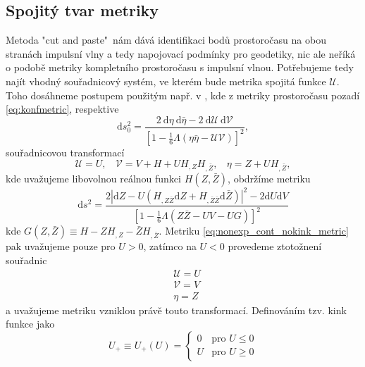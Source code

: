 \subsection{Spojitý tvar metriky}
Metoda "cut and paste"\ nám dává identifikaci bodů prostoročasu na obou stranách impulsní vlny a tedy napojovací podmínky
pro geodetiky, nic ale neříká o podobě metriky kompletního prostoročasu s impulsní vlnou. Potřebujeme tedy najít vhodný
souřadnicový systém, ve kterém bude metrika spojitá funkce $\mathcal{U}$. Toho dosáhneme postupem použitým např. v
\cite{Podolsky:2014ysa}, kde z metriky prostoročasu pozadí \eqref{eq:konfmetric}, respektive
\begin{equation}
    \label{eq:null_background_metric}
    \mathrm{d}s_0^2 = \frac{2~\mathrm{d}\eta~\mathrm{d}\bar{\eta}-2~\mathrm{d}\mathcal{U}~\mathrm{d}\mathcal{V}}
    {\left[1-\frac{1}{6}\Lambda \left(\eta \bar{\eta}
    -\mathcal{U}\mathcal{V}\right)\right]^2},
\end{equation}
souřadnicovou transformací
\begin{equation}
    \label{eq:nonexp_cont_transform}
    \mathcal{U}=U,~~~~ \mathcal{V}=V+H+UH_{,Z}H_{,\bar{Z}},~~~~ \eta=Z+UH_{,\bar{Z}},
\end{equation}
kde uvažujeme libovolnou reálnou funkci $H(Z, \bar{Z})$, obdržíme metriku
\begin{equation}
    \label{eq:nonexp_cont_nokink_metric}
    \mathrm{d} s^{2}=\frac{2\left|\mathrm{d} Z-U\left(H_{, Z \bar{Z}} 
    \mathrm{d} Z+H_{, \bar{Z} \bar{Z}} \mathrm{d} \bar{Z}\right)\right|^{2}-2 \mathrm{d} U 
    \mathrm{d} V}{\left[1-\frac{1}{6} \Lambda(Z \bar{Z}-U V-U G)\right]^{2}}
\end{equation}
kde $G(Z, \bar{Z}) \equiv H - Z H_{,Z}-\bar{Z}H_{,\bar{Z}}$. Metriku \eqref{eq:nonexp_cont_nokink_metric} pak 
uvažujeme pouze pro $U>0$, zatímco na $U<0$ provedeme ztotožnení souřadnic
\begin{equation}
    \label{eq:transformation_just_rename}
    \begin{split}
        &\mathcal{U} = U \\
        &\mathcal{V} = V \\
        &\eta = Z
    \end{split}
\end{equation}
a uvažujeme metriku vzniklou právě touto transformací.
Definováním
tzv. kink funkce jako
\begin{equation}
    \label{eq:kink_function}
    U_+ \equiv U_+(U) = \begin{cases}
        0 & \text{pro } U \leq 0 \\
        U & \text{pro } U \geq 0
    \end{cases}
\end{equation}
